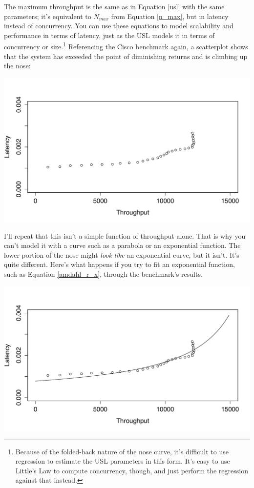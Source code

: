 \documentclass{vivid_layout}
\begin{document}
The maximum throughput is the same as in Equation \ref{usl} with the same
parameters; it's equivalent to $N_{max}$ from Equation \ref{n_max}, but in
latency instead of concurrency.  You can use these equations to model
scalability and performance in terms of latency, just as the USL models it in
terms of concurrency or size.\footnote{Because of the folded-back nature of the
nose curve, it's difficult to use regression to estimate the USL parameters in
this form. It's easy to use Little's Law to compute concurrency, though, and
just perform the regression against that instead.} Referencing the Cisco
benchmark again, a scatterplot shows that the system has exceeded the point of
diminishing returns and is climbing up the nose:
\begin{center}
\includegraphics[width=.85\linewidth]{scalability/not-a-function}
\end{center}

I'll repeat that this isn't a simple function of throughput alone. That is why
you can't model it with a curve such as a parabola or an exponential function.
The lower portion of the nose might {\itshape look like} an exponential curve,
but it isn't. It's quite different.  Here's what happens if you try to fit an
exponential function, such as Equation \ref{amdahl_r_x}, through the benchmark's
results.
\begin{center}
\includegraphics[width=.85\linewidth]{scalability/cisco-x-v-r-amdahl}
\end{center}
\end{document}
